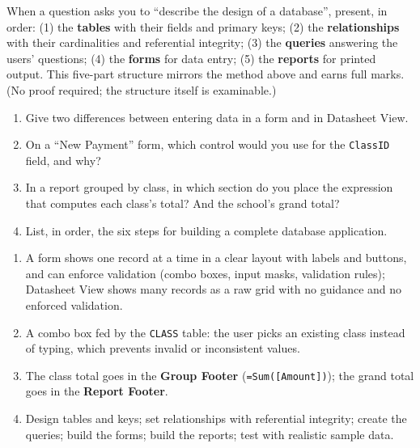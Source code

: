 \documentclass[11pt]{article}
\begin{document}
\begin{propriete}
When a question asks you to ``describe the design of a database'', present, in order: (1) the \textbf{tables} with their fields and primary keys; (2) the \textbf{relationships} with their cardinalities and referential integrity; (3) the \textbf{queries} answering the users' questions; (4) the \textbf{forms} for data entry; (5) the \textbf{reports} for printed output. This five-part structure mirrors the method above and earns full marks. (No proof required; the structure itself is examinable.)
\end{propriete}

\begin{exercice}
\begin{enumerate}
\item Give two differences between entering data in a form and in Datasheet View.
\item On a ``New Payment'' form, which control would you use for the \texttt{ClassID} field, and why?
\item In a report grouped by class, in which section do you place the expression that computes each class's total? And the school's grand total?
\item List, in order, the six steps for building a complete database application.
\end{enumerate}
\end{exercice}

\begin{corrige}[Exercise 1]
\begin{enumerate}
\item A form shows one record at a time in a clear layout with labels and buttons, and can enforce validation (combo boxes, input masks, validation rules); Datasheet View shows many records as a raw grid with no guidance and no enforced validation.
\item A combo box fed by the \texttt{CLASS} table: the user picks an existing class instead of typing, which prevents invalid or inconsistent values.
\item The class total goes in the \textbf{Group Footer} (\texttt{=Sum([Amount])}); the grand total goes in the \textbf{Report Footer}.
\item Design tables and keys; set relationships with referential integrity; create the queries; build the forms; build the reports; test with realistic sample data.
\end{enumerate}
\end{corrige}
\end{document}
